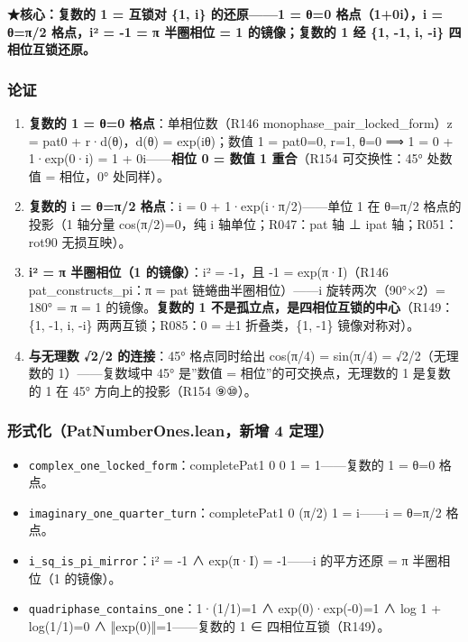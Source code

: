 \documentclass[
]{article}
\providecommand{\tightlist}{%
 \setlength{\itemsep}{0pt}\setlength{\parskip}{0pt}}
\begin{document}
\textbf{★核心：复数的 1 = 互锁对 \{1, i\} 的还原------1 = θ=0
格点（1+0i），i = θ=π/2 格点，i² = -1 = π 半圈相位 = 1 的镜像；复数的 1
经 \{1, -1, i, -i\} 四相位互锁还原。}

\subsubsection{论证}\label{ux8bbaux8bc1-1}

\begin{enumerate}
\def\labelenumi{\arabic{enumi}.}
\tightlist
\item
 \textbf{复数的 1 = θ=0 格点}：单相位数（R146
 monophase\_pair\_locked\_form）z = pat0 + r·d(θ)，d(θ) = exp(iθ)；数值
 1 = pat0=0, r=1, θ=0 ⟹ 1 = 0 + 1·exp(0·i) = 1 + 0i------\textbf{相位 0
 = 数值 1 重合}（R154 可交换性：45° 处数值 = 相位，0° 处同样）。
\item
 \textbf{复数的 i = θ=π/2 格点}：i = 0 + 1·exp(i·π/2)------单位 1 在
 θ=π/2 格点的投影（1 轴分量 cos(π/2)=0，纯 i 轴单位；R047：pat 轴 ⊥
 ipat 轴；R051：rot90 无损互映）。
\item
 \textbf{i² = π 半圈相位（1 的镜像）}：i² = -1，且 -1 = exp(π·I)（R146
 pat\_constructs\_pi：π = pat 链蜷曲半圈相位）------i
 旋转两次（90°×2）= 180° = π = 1 的镜像。\textbf{复数的 1
 不是孤立点，是四相位互锁的中心}（R149：\{1, -1, i, -i\}
 两两互锁；R085：0 = ±1 折叠类，\{1, -1\} 镜像对称对）。
\item
 \textbf{与无理数 √2/2 的连接}：45° 格点同时给出 cos(π/4) = sin(π/4) =
 √2/2（无理数的 1）------复数域中 45° 是''数值 =
 相位''的可交换点，无理数的 1 是复数的 1 在 45° 方向上的投影（R154
 ⑨⑩）。
\end{enumerate}

\subsubsection{形式化（PatNumberOnes.lean，新增 4
定理）}\label{ux5f62ux5f0fux5316patnumberones.leanux65b0ux589e-4-ux5b9aux7406}

\begin{itemize}
\tightlist
\item
 \texttt{complex\_one\_locked\_form}：completePat1 0 0 1 =
 1------复数的 1 = θ=0 格点。
\item
 \texttt{imaginary\_one\_quarter\_turn}：completePat1 0 (π/2) 1 =
 i------i = θ=π/2 格点。
\item
 \texttt{i\_sq\_is\_pi\_mirror}：i² = -1 ∧ exp(π·I) = -1------i
 的平方还原 = π 半圈相位（1 的镜像）。
\item
 \texttt{quadriphase\_contains\_one}：1·(1/1)=1 ∧ exp(0)·exp(-0)=1 ∧
 log 1 + log(1/1)=0 ∧ ‖exp(0)‖=1------复数的 1 ∈ 四相位互锁（R149）。
\end{itemize}
\end{document}
